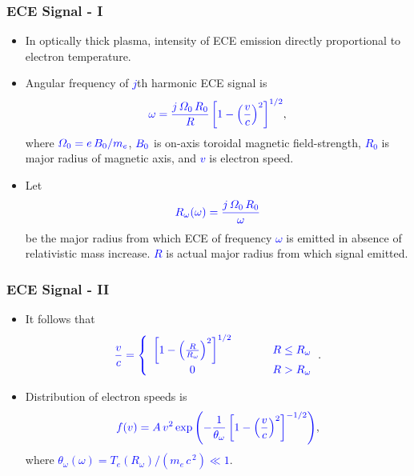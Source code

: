 \documentclass{beamer}
\begin{document}
\begin{frame}
\frametitle{ECE Signal - I}
 
 \begin{itemize}
 \item In optically thick plasma, intensity of ECE emission directly proportional to electron temperature.
 \item Angular frequency of \textcolor{blue}{$j$}th harmonic ECE signal is
 $$
 \textcolor{blue}{\omega = \frac{j\,{\mit\Omega}_0\,R_0}{R}\left[1-\left(\frac{v}{c}\right)^2\right]^{1/2}},
 $$
 where $\textcolor{blue}{{\mit\Omega}_0=e\,B_0/m_e}$, $\textcolor{blue}{B_0}$ is on-axis toroidal magnetic field-strength,  \textcolor{blue}{$R_0$} is major radius of magnetic axis, and \textcolor{blue}{$v$}
 is electron speed. 
 \item Let 
 $$
 \textcolor{blue}{R_\omega(\omega) = \frac{j\,{\mit\Omega}_0\,R_0}{\omega}}
 $$
be the major radius from which ECE of frequency \textcolor{blue}{$\omega$} is emitted  in  absence of relativistic mass increase. \textcolor{blue}{$R$}
is actual major radius from which signal emitted. 
\end{itemize}
 \end{frame}
 
\begin{frame}
\frametitle{ECE Signal - II}
 
\begin{itemize}

\item It follows that
\begin{align*}
\textcolor{blue}{\frac{v}{c} =\left\{\begin{array}{ccc}\left[1-\left(\frac{R}{R_\omega}\right)^2\right]^{1/2}&~~~~~&R\leq R_\omega\\[1ex]
0&&R>R_\omega
\end{array}\right.}.
\end{align*}

 \item Distribution of electron speeds is
$$
\textcolor{blue}{f(v)= A\,v^2\,{\rm exp}\left(-\frac{1}{\theta_\omega}\left[1-\left(\frac{v}{c}\right)^2\right]^{-1/2}\right)},
$$
where
\textcolor{blue}{$\theta_\omega(\omega) = T_e(R_\omega)/(m_e\,c^{\,2})\ll 1$}. 
\end{itemize}

\end{frame}
\end{document}
